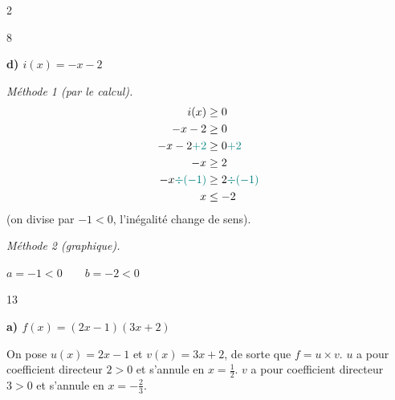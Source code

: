 \documentclass[10pt,a4paper]{article}
\begin{document}
\begin{multicols}{2}
\begin{corr}{8}
\bigskip

\textbf{d) \(i(x)=-x-2\)}

\smallskip

\textit{Méthode 1 (par le calcul).}
\[
\begin{aligned}
i(x) &\geq 0\\
-x-2 &\geq 0\\
-x-2\textcolor{teal}{+2} &\geq 0\textcolor{teal}{+2}\\
-x &\geq 2\\
-x\textcolor{teal}{\div(-1)} &\geq 2\textcolor{teal}{\div(-1)}\\
x &\leq -2
\end{aligned}
\]
(on divise par \(-1<0\), l'inégalité change de sens).

\smallskip

\textit{Méthode 2 (graphique).}

\begin{center}

\(a=-1<0 \qquad b=-2<0\)
\end{center}

\begin{center}
\end{center}

\end{corr}

\columnbreak

\begin{corr}{13}



\textbf{a) \(f(x)=(2x-1)(3x+2)\)}

On pose \(u(x)=2x-1\) et \(v(x)=3x+2\), de sorte que \(f=u\times v\). \(u\) a pour coefficient directeur \(2>0\) et s'annule en \(x=\frac{1}{2}\). \(v\) a pour coefficient directeur \(3>0\) et s'annule en \(x=-\frac{2}{3}\).

\begin{center}
\end{center}


\end{corr}
\end{multicols}
\end{document}
